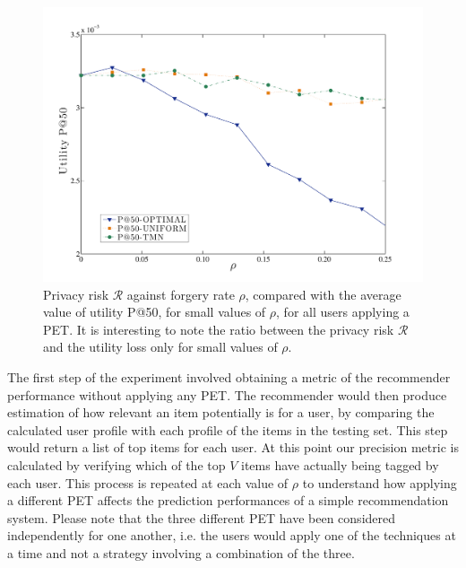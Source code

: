 \begin{figure}[htb]  
\includegraphics[width=\textwidth]{figures/Fig6b.pdf}
\caption[Privacy risk against forgery rate compared to the average utility value P@50]{Privacy risk $\mathcal{R}$ against forgery rate $\rho$, compared with the average value of utility P@50, for small values of $\rho$, for all users applying a PET. It is interesting to note the ratio between the privacy risk $\mathcal{R}$ and the utility loss only for small values of $\rho$.}
\label{fig:Utility-Risk-Rho-Small}
\end{figure}

The first step of the experiment involved obtaining a metric of the recommender performance without applying any PET. The recommender would then produce estimation of how relevant an item potentially is for a user, by comparing the calculated user profile with each profile of the items in the testing set. This step would return a list of top items for each user. At this point our precision metric is calculated by verifying which of the top $V$ items have actually being tagged by each user. This process is repeated at each value of $\rho$ to understand how applying a different PET affects the prediction performances of a simple recommendation system. Please note that the three different PET have been considered independently for one another, i.e. the users would apply one of the techniques at a time and not a strategy involving a combination of the three.

